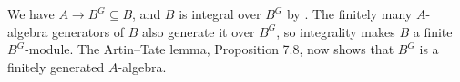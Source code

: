 We have $A\to B^G\subseteq B$, and $B$ is integral over $B^G$ by . The finitely many $A$-algebra generators of $B$ also generate it over $B^G$, so integrality makes $B$ a finite $B^G$-module. The Artin–Tate lemma, Proposition 7.8, now shows that $B^G$ is a finitely generated $A$-algebra.
